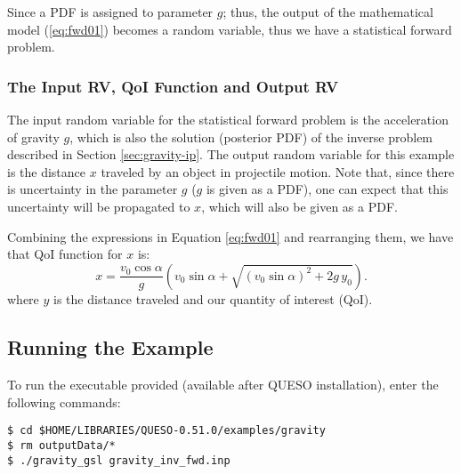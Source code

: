 Since a PDF is assigned to parameter $g$; thus, the output of the mathematical model (\ref{eq:fwd01}) 
becomes a random variable, thus we have a statistical forward problem. 

\subsubsection{The Input RV, QoI Function and Output RV}
 
The input random variable for the statistical forward problem is the acceleration of gravity $g$, 
which is also the solution (posterior PDF) of the inverse problem described in Section \ref{sec:gravity-ip}. 
The output random variable for this example is the distance $x$ traveled by an object in projectile motion. 
Note that, since there is uncertainty in the parameter $g$ ($g$ is given as a PDF), one can 
expect that this uncertainty will be propagated to $x$, which will also be given as a PDF.

Combining the expressions in Equation \ref{eq:fwd01} and rearranging them, we have that QoI 
function for $x$ %
is: 
\begin{equation}\label{eq:fp_deterministic}
x=\dfrac{ v_0 \cos \alpha }{g} \left( v_0  \sin \alpha  + \sqrt{ ( v_0  \sin \alpha)^2 + 2g\, y_0 }\right).                                                                                        
\end{equation}
where $y$ is the distance traveled and our quantity of interest (QoI). 

\subsection{Running the Example}\label{sec:gravity-run}
 
To run the executable provided (available after QUESO installation), enter the following commands:
\begin{lstlisting}[label={},caption={}]
$ cd $HOME/LIBRARIES/QUESO-0.51.0/examples/gravity
$ rm outputData/*
$ ./gravity_gsl gravity_inv_fwd.inp
\end{lstlisting}

